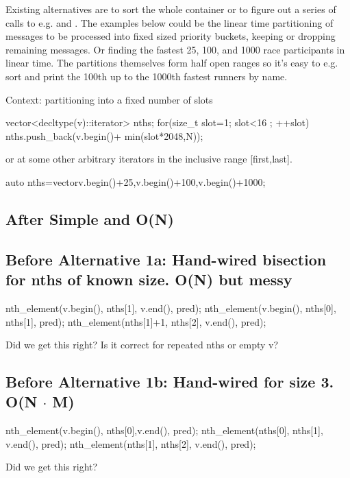 Existing alternatives are to sort the whole container or to figure out a series of calls to e.g.  and . 
The examples below could be the linear time partitioning of messages to be
processed into fixed sized priority buckets, keeping or dropping remaining messages. Or finding the fastest 25, 100, and 1000 race participants in linear time. 
The partitions themselves form half open ranges so it's easy to e.g. sort and
print the 100th up to the 1000th fastest runners by name. 

Context: partitioning into a fixed number of slots
\begin{codeblock}
vector<decltype(v)::iterator> nths;
for(size_t slot=1; slot<16 ; ++slot){
	nths.push_back(v.begin()+ min(slot*2048,N));
}
\end{codeblock}
or at some other arbitrary iterators in the inclusive range [first,last].
\begin{codeblock}
auto nths=vector{v.begin()+25,v.begin()+100,v.begin()+1000}; 
\end{codeblock}

\subsection*{After \textnormal{ Simple and O(N)}}

\hspace{2ex}
\vspace*{1ex}

\subsection*{Before \textnormal{Alternative 1a: Hand-wired bisection for nths of known size. O(N) but messy}}
\begin{codeblock}
nth_element(v.begin(), nths[1], v.end(), pred);
nth_element(v.begin(), nths[0], nths[1], pred);
nth_element(nths[1]+1, nths[2], v.end(), pred);
\end{codeblock}
Did we get this right? Is it correct for repeated nths or empty v?

\subsection*{Before \textnormal{Alternative 1b: Hand-wired for size 3. O(N $\cdot$ M)}}
\begin{codeblock}
nth_element(v.begin(), nths[0],v.end(), pred);
nth_element(nths[0], nths[1], v.end(), pred);
nth_element(nths[1], nths[2], v.end(), pred);
\end{codeblock}
Did we get this right?

